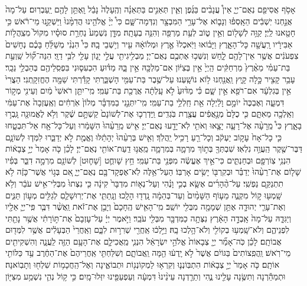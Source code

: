 \documentclass[twoside, openany, parskip=half, 11pt]{book}
\begin{document}
\begin{footnotesize}
\begin{multicols}{2}
אָסֹ֥ף אֲסִיפֵ֖ם נְאֻם־יְיָ֑ אֵין֩ עֲנָבִ֨ים בַּגֶּ֜פֶן וְאֵ֧ין תְּאֵנִ֣ים בַּתְּאֵנָ֗ה וְהֶֽעָלֶה֙ נָבֵ֔ל וָֽאֶתֵּ֥ן לָהֶ֖ם יַֽעַבְרֽוּם׃ עַל־מָה֙ אֲנַ֣חְנוּ יֽשְׁבִ֔ים הֵאָֽסְפ֗וּ וְנָב֛וֹא אֶל־עָרֵ֥י הַמִּבְצָ֖ר וְנִדְּמָה־שָּׁ֑ם כִּי֩ יְיָ֨ אֱלֹהֵ֤ינוּ הֲדִמָּ֨נוּ֙ וַיַּשְׁקֵ֣נוּ מֵי־רֹ֔אשׁ כִּ֥י חָטָ֖אנוּ לַֽיְיָ׃ קַוֵּ֥ה לְשָׁל֖וֹם וְאֵ֣ין ט֑וֹב לְעֵ֥ת מַרְפֵּ֖ה וְהִנֵּ֥ה בְעָתָֽה׃ מִדָּ֤ן נִשְׁמַע֙ נַחְרַ֣ת סוּסָ֗יו מִקּוֹל֙ מִצְֽהֲל֣וֹת אַבִּירָ֔יו רָֽעֲשָׁ֖ה כָּל־הָאָ֑רֶץ וַיָּב֗וֹאוּ וַיֹּֽאכְלוּ֙ אֶ֣רֶץ וּמְלוֹאָ֔הּ עִ֖יר וְי֥שְׁבֵי בָֽהּ׃ כִּי֩ הִנְנִ֨י מְשַׁלֵּ֜חַ בָּכֶ֗ם נְחָשִׁים֙ צִפְעֹנִ֔ים אֲשֶׁ֥ר אֵין־לָהֶ֖ם לָ֑חַשׁ וְנִשְּׁכ֥וּ אֶתְכֶ֖ם נְאֻם־יְיָ׃ מַבְלִ֥יגִיתִ֖י עֲלֵ֣י יָג֑וֹן עָלַ֖י לִבִּ֥י דַוָּֽי׃ הִנֵּה־ק֞וֹל שַֽׁוְעַ֣ת בַּת־עַמִּ֗י מֵאֶ֨רֶץ֙ מַרְחַקִּ֔ים הַֽיְיָ֙ אֵ֣ין בְּצִיּ֔וֹן אִם־מַלְכָּ֖הּ אֵ֣ין בָּ֑הּ מַדּ֗וּעַ הִכְעִס֛וּנִי בִּפְסִֽלֵיהֶ֖ם בְּהַבְלֵ֥י נֵכָֽר׃ עָבַ֥ר קָצִ֖יר כָּ֣לָה קָ֑יִץ וַֽאֲנַ֖חְנוּ ל֥וֹא נוֹשָֽׁעְנוּ׃ עַל־שֶׁ֥בֶר בַּת־עַמִּ֖י הָשְׁבַּ֑רְתִּי קָדַ֕רְתִּי שַׁמָּ֖ה הֶחֱזִקָֽתְנִי׃ הַצֳרִי֙ אֵ֣ין בְּגִלְעָ֔ד אִם־רֹפֵ֖א אֵ֣ין שָׁ֑ם כִּ֗י מַדּ֨וּעַ֙ לֹ֣א עָֽלְתָ֔ה אֲרֻכַ֖ת בַּת־עַמִּֽי׃ מִֽי־יִתֵּ֤ן רֹאשִׁי֙ מַ֔יִם וְעֵינִ֖י מְק֣וֹר דִּמְעָ֑ה וְאֶבְכֶּה֙ יוֹמָ֣ם וָלַ֔יְלָה אֵ֖ת חַֽלְלֵ֥י בַת־עַמִּֽי׃ מִֽי־יִתְּנֵ֣נִי בַמִּדְבָּ֗ר מְלוֹן֙ אֹֽרְחִ֔ים וְאֶֽעֶזְבָה֙ אֶת־עַמִּ֔י וְאֵֽלְכָ֖ה מֵאִתָּ֑ם כִּ֤י כֻלָּם֙ מְנָ֣אֲפִ֔ים עֲצֶ֖רֶת בֹּֽגְדִֽים׃ וַֽיַּדְרְכ֤וּ אֶת־לְשׁוֹנָם֙ קַשְׁתָּ֣ם שֶׁ֔קֶר וְלֹ֥א לֶאֱמוּנָ֖ה גָּֽבְר֣וּ בָאָ֑רֶץ כִּי֩ מֵֽרָעָ֨ה אֶל־רָעָ֧ה יָצָ֛אוּ וְאֹתִ֥י לֹֽא־יָדָ֖עוּ נְאֻם־יְיָ׃ אִ֤ישׁ מֵֽרֵעֵ֨הוּ֙ הִשָּׁמֵ֔רוּ וְעַל־כָּל־אָ֖ח אַל־תִּבְטָ֑חוּ כִּ֤י כָל־אָח֙ עָק֣וֹב יַעְקֹ֔ב וְכָל־רֵ֖עַ רָכִ֥יל יַֽהֲלֹֽךְ׃ וְאִ֤ישׁ בְּרֵעֵ֨הוּ֙ יְהָתֵ֔לּוּ וֶאֱמֶ֖ת לֹ֣א יְדַבֵּ֑רוּ לִמְּד֧וּ לְשׁוֹנָ֛ם דַּבֶּר־שֶׁ֖קֶר הַֽעֲוֵ֥ה נִלְאֽוּ׃ שִׁבְתְּךָ֖ בְּת֣וֹךְ מִרְמָ֑ה בְּמִרְמָ֛ה מֵֽאֲנ֥וּ דַֽעַת־אוֹתִ֖י נְאֻם־יְיָ׃ לָכֵ֗ן כֹּ֤ה אָמַר֙ יְיָ֣ צְבָא֔וֹת הִנְנִ֥י צֽוֹרְפָ֖ם וּבְחַנְתִּ֑ים כִּי־אֵ֣יךְ אֶעֱשֶׂ֔ה מִפְּנֵ֖י בַּת־עַמִּֽי׃ חֵ֥ץ שָׁוחֻ֛ט [שָׁח֛וּט] לְשׁוֹנָ֖ם מִרְמָ֣ה דִבֵּ֑ר בְּפִ֗יו שָׁל֤וֹם אֶת־רֵעֵ֨הוּ֙ יְדַבֵּ֗ר וּבְקִרְבּ֖וֹ יָשִׂ֥ים אָרְבּֽוֹ׃ הַעַל־אֵ֥לֶּה לֹֽא־אֶפְקָד־בָּ֖ם נְאֻם־יְיָ֑ אִ֚ם בְּג֣וֹי אֲשֶׁר־כָּזֶ֔ה לֹ֥א תִתְנַקֵּ֖ם נַפְשִֽׁי׃ עַל־הֶ֨הָרִ֜ים אֶשָּׂ֧א בְכִ֣י וָנֶ֗הִי וְעַל־נְא֤וֹת מִדְבָּר֙ קִינָ֔ה כִּ֤י נִצְּתוּ֙ מִבְּלִי־אִ֣ישׁ עֹבֵ֔ר וְלֹ֥א שָֽׁמְע֖וּ ק֣וֹל מִקְנֶ֑ה מֵע֤וֹף הַשָּׁמַ֨יִם֙ וְעַד־בְּהֵמָ֔ה נָֽדְד֖וּ הָלָֽכוּ׃ וְנָֽתַתִּ֧י אֶת־יְרֽוּשָׁלַ֛םִ לְגַלִּ֖ים מְע֣וֹן תַּנִּ֑ים וְאֶת־עָרֵ֧י יְהוּדָ֛ה אֶתֵּ֥ן שְׁמָמָ֖ה מִבְּלִ֖י יוֹשֵֽׁב׃ מִֽי־הָאִ֤ישׁ הֶֽחָכָם֙ וְיָבֵ֣ן אֶת־זֹ֔את וַֽאֲשֶׁ֨ר דִּבֶּ֧ר פִּֽי־יְיָ֛ אֵלָ֖יו וְיַגִּדָ֑הּ עַל־מָה֙ אָֽבְדָ֣ה הָאָ֔רֶץ נִצְּתָ֥ה כַמִּדְבָּ֖ר מִבְּלִ֖י עֹבֵֽר׃ וַיֹּ֣אמֶר יְיָ֔ עַל־עָזְבָם֙ אֶת־תּ֣וֹרָתִ֔י אֲשֶׁ֥ר נָתַ֖תִּי לִפְנֵיהֶ֑ם וְלֹא־שָֽׁמְע֥וּ בְקוֹלִ֖י וְלֹא־הָ֥לְכוּ בָֽהּ׃ וַיֵּ֣לְכ֔וּ אַֽחֲרֵ֖י שְׁרִר֣וּת לִבָּ֑ם וְאַֽחֲרֵי֙ הַבְּעָלִ֔ים אֲשֶׁ֥ר לִמְּד֖וּם אֲבוֹתָֽם׃ לָכֵ֗ן כֹּֽה־אָמַ֞ר יְיָ֤ צְבָאוֹת֙ אֱלֹהֵ֣י יִשְׂרָאֵ֔ל הִנְנִ֧י מַֽאֲכִילָ֛ם אֶת־הָעָ֥ם הַזֶּ֖ה לַֽעֲנָ֑ה וְהִשְׁקִיתִ֖ים מֵי־רֹֽאשׁ׃ וַֽהֲפִֽצוֹתִים֙ בַּגּוֹיִ֔ם אֲשֶׁר֙ לֹ֣א יָֽדְע֔וּ הֵ֖מָּה וַֽאֲבוֹתָ֑ם וְשִׁלַּחְתִּ֤י אַֽחֲרֵיהֶם֙ אֶת־הַחֶ֔רֶב עַ֥ד כַּלּוֹתִ֖י אוֹתָֽם׃ כֹּ֤ה אָמַר֙ יְיָ֣ צְבָא֔וֹת הִתְבּֽוֹנְנ֛וּ וְקִרְא֥וּ לַמְקוֹנְנ֖וֹת וּתְבוֹאֶ֑ינָה וְאֶל־הַֽחֲכָמ֥וֹת שִׁלְח֖וּ וְתָבֽוֹאנָה׃ וּתְמַהֵ֕רְנָה וְתִשֶּׂ֥נָה עָלֵ֖ינוּ נֶ֑הִי וְתֵרַ֤דְנָה עֵינֵ֨ינוּ֙ דִּמְעָ֔ה וְעַפְעַפֵּ֖ינוּ יִזְּלוּ־מָֽיִם׃ כִּ֣י ק֥וֹל נְהִ֛י נִשְׁמַ֥ע מִצִּיּ֖וֹן 
\end{multicols}
\end{footnotesize}
\end{document}
